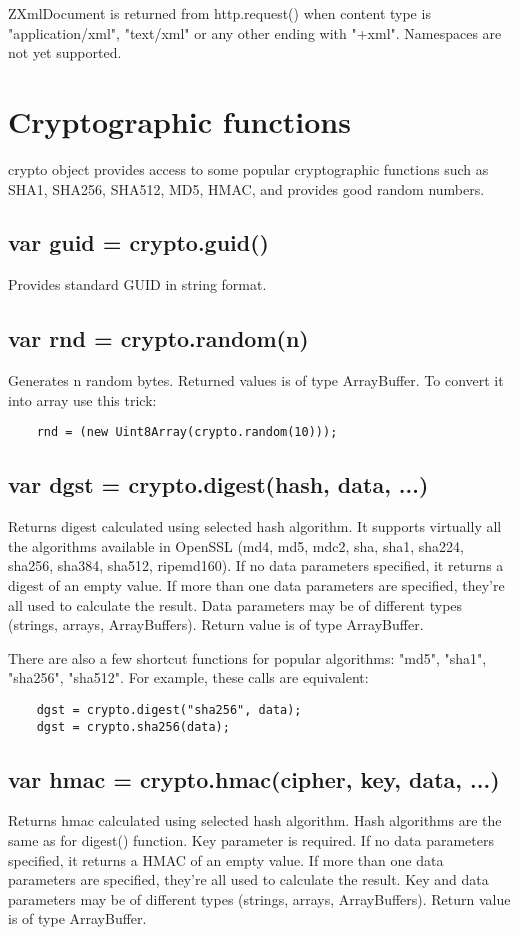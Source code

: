 ZXmlDocument is returned from http.request() when content type is "application/xml", "text/xml" or any other ending with "+xml". Namespaces are not yet supported.

\section{Cryptographic functions}

crypto object provides access to some popular cryptographic functions such
as SHA1, SHA256, SHA512, MD5, HMAC, and provides good random numbers.

\subsection{var guid = crypto.guid()}
Provides standard GUID in string format.

\subsection{var rnd = crypto.random(n)}
Generates n random bytes.
Returned values is of type ArrayBuffer. To convert it into array use this trick:
\begin{lstlisting}
	rnd = (new Uint8Array(crypto.random(10)));
\end{lstlisting}

\subsection{var dgst = crypto.digest(hash, data, ...)}
Returns digest calculated using selected hash algorithm. It supports virtually all the algorithms available in OpenSSL (md4, md5, mdc2, sha, sha1, sha224, sha256, sha384, sha512, ripemd160).
If no data parameters specified, it returns a digest of an empty value. If more than one data parameters are specified, they're all used to calculate the result. Data parameters may be of different types (strings, arrays, ArrayBuffers).
Return value is of type ArrayBuffer.

There are also a few shortcut functions for popular algorithms: "md5", "sha1", "sha256", "sha512". For example, these calls are equivalent:

\begin{lstlisting}
	dgst = crypto.digest("sha256", data);
	dgst = crypto.sha256(data);
\end{lstlisting}

\subsection{var hmac = crypto.hmac(cipher, key, data, ...)}
Returns hmac calculated using selected hash algorithm. Hash algorithms are the same as for digest() function.
Key parameter is required. 
If no data parameters specified, it returns a HMAC of an empty value. If more than one data parameters are specified, they're all used to calculate the result. Key and data parameters may be of different types (strings, arrays, ArrayBuffers).
Return value is of type ArrayBuffer.

